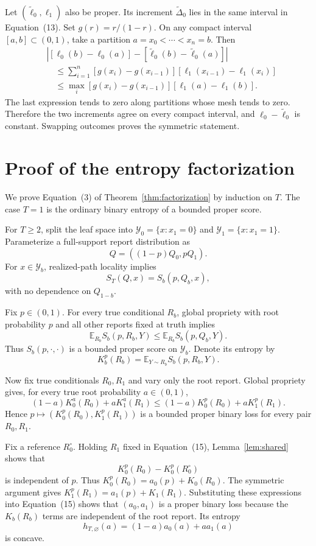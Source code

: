 \documentclass{article}
\theoremstyle{definition}
\theoremstyle{remark}
\newcommand{\E}{\mathbb E}
\newcommand{\1}{\mathbf 1}
\begin{document}
Let \((\widetilde\ell_0,\ell_1)\) also be proper. Its increment \(\widetilde\Delta_0\) lies in the same interval in Equation~(13). Set \(g(r)=r/(1-r)\). On any compact interval \([a,b]\subset(0,1)\), take a partition \(a=x_0<\cdots<x_n=b\). Then
\begin{align*}
&\left|[\ell_0(b)-\ell_0(a)]-[\widetilde\ell_0(b)-\widetilde\ell_0(a)]\right|\\
&\quad\le\sum_{i=1}^n[g(x_i)-g(x_{i-1})][\ell_1(x_{i-1})-\ell_1(x_i)]\\
&\quad\le\max_i[g(x_i)-g(x_{i-1})][\ell_1(a)-\ell_1(b)].
\end{align*}
The last expression tends to zero along partitions whose mesh tends to zero. Therefore the two increments agree on every compact interval, and \(\ell_0-\widetilde\ell_0\) is constant. Swapping outcomes proves the symmetric statement.

\section{Proof of the entropy factorization}\label{app:factorization}

We prove Equation~(3) of Theorem~\ref{thm:factorization} by induction on \(T\). The case \(T=1\) is the ordinary binary entropy of a bounded proper score.

For \(T\ge2\), split the leaf space into \(\mathcal Y_0=\{x:x_1=0\}\) and \(\mathcal Y_1=\{x:x_1=1\}\). Parameterize a full-support report distribution as \[ Q=((1-p)Q_0,pQ_1). \] For \(x\in\mathcal Y_b\), realized-path locality implies \[ S_T(Q,x)=S_b(p,Q_b,x), \tag{14} \] with no dependence on \(Q_{1-b}\).

Fix \(p\in(0,1)\). For every true conditional \(R_b\), global propriety with root probability \(p\) and all other reports fixed at truth implies \[ \E_{R_b}S_b(p,R_b,Y)\le\E_{R_b}S_b(p,Q_b,Y). \] Thus \(S_b(p,\cdot,\cdot)\) is a bounded proper score on \(\mathcal Y_b\). Denote its entropy by \[ K_b^p(R_b)=\E_{Y\sim R_b}S_b(p,R_b,Y). \]

Now fix true conditionals \(R_0,R_1\) and vary only the root report. Global propriety gives, for every true root probability \(a\in(0,1)\), \[ (1-a)K_0^a(R_0)+aK_1^a(R_1) \le(1-a)K_0^p(R_0)+aK_1^p(R_1). \tag{15} \] Hence \(p\mapsto(K_0^p(R_0),K_1^p(R_1))\) is a bounded proper binary loss for every pair \(R_0,R_1\).

Fix a reference \(R_0^\circ\). Holding \(R_1\) fixed in Equation~(15), Lemma~\ref{lem:shared} shows that \[ K_0^p(R_0)-K_0^p(R_0^\circ) \] is independent of \(p\). Thus \(K_0^p(R_0)=a_0(p)+K_0(R_0)\). The symmetric argument gives \(K_1^p(R_1)=a_1(p)+K_1(R_1)\). Substituting these expressions into Equation~(15) shows that \((a_0,a_1)\) is a proper binary loss because the \(K_b(R_b)\) terms are independent of the root report. Its entropy \[ h_{T,\varnothing}(a)=(1-a)a_0(a)+aa_1(a) \] is concave.
\end{document}
